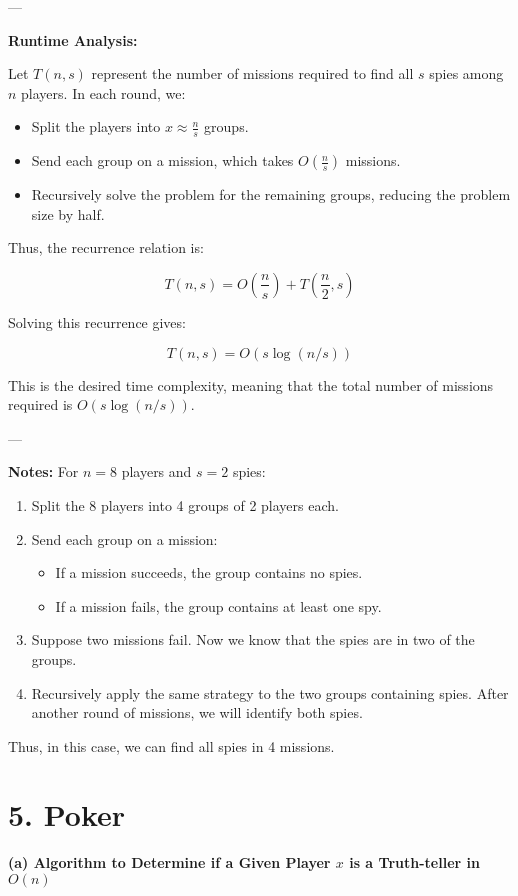 \documentclass[11pt]{article}
\begin{document}
---

\textbf{Runtime Analysis:}

Let \(T(n, s)\) represent the number of missions required to find all \(s\) spies among \(n\) players. In each round, we:

\begin{itemize}
    \item Split the players into \(x \approx \frac{n}{s}\) groups.
    \item Send each group on a mission, which takes \(O\left(\frac{n}{s}\right)\) missions.
    \item Recursively solve the problem for the remaining groups, reducing the problem size by half.
\end{itemize}

Thus, the recurrence relation is:

\[
T(n, s) = O\left(\frac{n}{s}\right) + T\left(\frac{n}{2}, s\right)
\]

Solving this recurrence gives:

\[
T(n, s) = O(s \log(n/s))
\]

This is the desired time complexity, meaning that the total number of missions required is \(O(s \log(n/s))\).

---

\textbf{Notes:} For \(n = 8\) players and \(s = 2\) spies:

\begin{enumerate}
    \item Split the 8 players into 4 groups of 2 players each.
    \item Send each group on a mission:
        \begin{itemize}
            \item If a mission succeeds, the group contains no spies.
            \item If a mission fails, the group contains at least one spy.
        \end{itemize}
    \item Suppose two missions fail. Now we know that the spies are in two of the groups.
    \item Recursively apply the same strategy to the two groups containing spies. After another round of missions, we will identify both spies.
\end{enumerate}

Thus, in this case, we can find all spies in 4 missions.


\newpage
\section*{5. Poker}
\textbf{(a) Algorithm to Determine if a Given Player \(x\) is a Truth-teller in \(O(n)\)}
\end{document}
